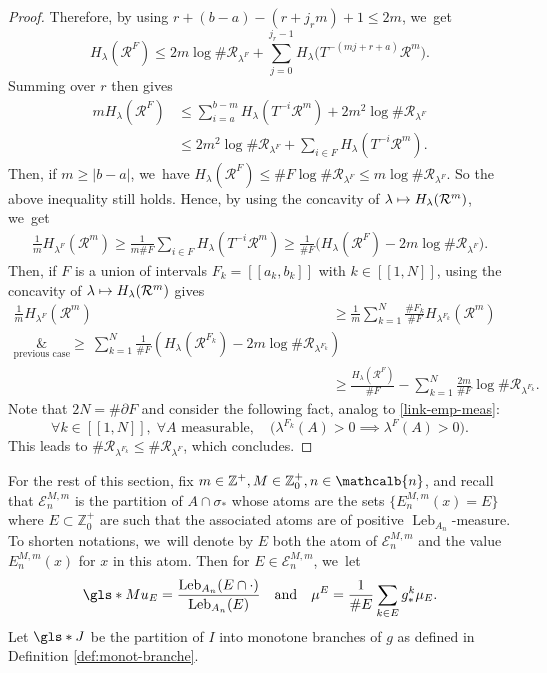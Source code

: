 \documentclass[10pt]{amsart}
\newcommand\mto{\mathchoice{\longmapsto}{\mapsto}{\mapsto}{\mapsto}}
\DeclareMathOperator{\Leb}{Leb}
\newcommand{\mcbn}{{\mathcalb{n}}}
\theoremstyle{definition}
\newcommand{\bbZ}{{\mathbb{Z}}}
\begin{document}
\begin{proof}
Therefore, by using $r + (b-a) - (r+ j_r m) + 1 \leq 2m$, we~get
\[
H_{\lambda}(\mathcal{R}^F) \leq 2m \log \# \mathcal{R}_{\lambda^F} + \sum_{j=0}^{j_r - 1} H_{\lambda} \bigl (T^{-(mj + r+a)} \mathcal{R}^m \bigr).
\]
Summing over $r$ then gives
\begin{align*}
m H_{\lambda}(\mathcal{R}^F) &\leq \sum_{i=a}^{b-m} H_{\lambda}(T^{-i} \mathcal{R}^m) + 2m^2 \log \# \mathcal{R}_{\lambda^F}\\
&\leq 2m^2 \log \# \mathcal{R}_{\lambda^F} + \sum_{i \in F} H_{\lambda}(T^{-i} \mathcal{R}^m).
\end{align*}
Then, if $m \geq |b-a|$, we~have $H_{\lambda}(\mathcal{R}^F) \leq \# F \log \# \mathcal{R}_{\lambda^F} \leq m \log \# \mathcal{R}_{\lambda^F}$. So the above inequality still holds.
Hence, by using the concavity of $\lambda \mto H_{\lambda}(\mathcal{R}^m)$, we~get
\begin{align*}
\frac{1}{m} H_{\lambda^F}(\mathcal{R}^m) \geq \frac{1}{m \# F} \sum_{i \in F} H_{\lambda}(T^{-i} \mathcal{R}^m)
\geq \frac{1}{\# F} \bigl (H_{\lambda}(\mathcal{R}^F) - 2m \log \# \mathcal{R}_{\lambda^F} \bigr).
\end{align*}
Then, if $F$ is a union of intervals $F_k = [\![ a_k, b_k ]\!]$ with $k \in [\![ 1, N ]\!]$, using the concavity of $\lambda \mto H_{\lambda}(\mathcal{R}^m)$ gives
\begin{align*}
\frac{1}{m} H_{\lambda^F}(\mathcal{R}^m) &\geq \frac{1}{m} \sum_{k=1}^N \frac{\# F_k}{\# F} H_{\lambda^{F_k}}(\mathcal{R}^m)\\
\underset{\text{previous case}}&{\geq} \: \sum_{k=1}^N \frac{1}{\# F} \left (H_{\lambda}(\mathcal{R}^{F_k}) - 2m \log \# \mathcal{R}_{\lambda^{F_k}} \right)\\
&\geq \frac{H_{\lambda}(\mathcal{R}^F)}{\# F} - \sum_{k=1}^N \frac{2m}{\# F} \log \# \mathcal{R}_{\lambda^{F_k}}.
\end{align*}
Note that $2N = \# \partial F$ and consider the following fact, analog to \eqref{link-emp-meas}:
\[
\forall k \in [\![ 1, N ]\!],\; \forall A \text{ measurable},\quad \bigl (\lambda^{F_k}(A) > 0 \implies \lambda^F(A) > 0 \bigr).
\]
This leads to $\# \mathcal{R}_{\lambda^{F_k}} \leq \# \mathcal{R}_{\lambda^F}$, which concludes.
\end{proof}

For the rest of this section, fix $m \in \bbZ^+, M \in \bbZ_0^+, n \in \mcbn$, and recall that
$\mathcal{E}_n^{M,m}$ is the partition of $A \cap \sigma_*$ whose atoms are the sets $\{ E_n^{M,m}(x) = E \}$ where $E \subset \bbZ_0^+$ are such that the associated atoms are of positive $\Leb_{A_n}$-measure.
To shorten notations, we~will denote by $E$ both the atom of $\mathcal{E}_n^{M,m}$ and the value $E_n^{M,m}(x)$ for $x$ in this atom. Then for $E \in \mathcal{E}_n^{M,m}$, we~let
\[
\gls*{Mu_E} = \frac{\Leb_{A_n}(E \cap \cdot)}{\Leb_{A_n}(E)} \quad \text{and} \quad \mu^E = \frac{1}{\# E} \sum_{k \in E} g^k_* \mu_E.
\]
Let $\gls*{J}$ be the partition of $I$ into monotone branches of $g$ as defined in Definition \ref{def:monot-branche}.
\end{document}
